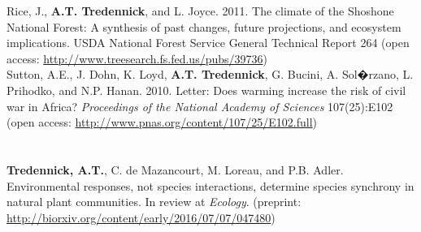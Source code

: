 \documentclass[margin,line]{resume}
\begin{document}
\begin{resume}
   Rice, J., \textbf{A.T. Tredennick}, and L. Joyce. 2011. The climate of the Shoshone National Forest: A synthesis of past changes, future projections, and 			ecosystem implications. USDA National Forest Service General Technical Report 264 (open access: \href{http://www.treesearch.fs.fed.us/pubs/39736}{http://www.treesearch.fs.fed.us/pubs/39736}) \vspace{-6mm}\\%
	
	Sutton, A.E., J. Dohn, K. Loyd, \textbf{A.T. Tredennick}, G. Bucini, A. Sol�rzano, L. Prihodko, and N.P. Hanan. 2010. Letter: Does warming increase the risk of civil war 	in Africa? \textsl{Proceedings of the National Academy of Sciences} 107(25):E102 \\ (open access: \href{http://www.pnas.org/content/107/25/E102.full}{http://www.pnas.org/content/107/25/E102.full}) %
	
	\section{\textmd{\textsf{}}}
     \textbf{Tredennick, A.T.}, C. de Mazancourt, M. Loreau, and P.B. Adler. Environmental responses, not species interactions, determine species synchrony in natural plant communities. In review at \emph{Ecology}. (preprint: \href{http://biorxiv.org/content/early/2016/07/07/047480}{http://biorxiv.org/content/early/2016/07/07/047480})
     
	

\end{resume}
\end{document}
